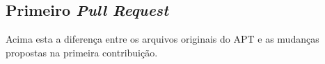 \begin{apendicesenv}

\partapendices

\chapter{Primeiro \textit{Pull Request}}


% 
% 
% 
%  
% 
Acima esta a diferença entre os arquivos originais do APT e as mudanças propostas na primeira contribuição.



\end{apendicesenv}
